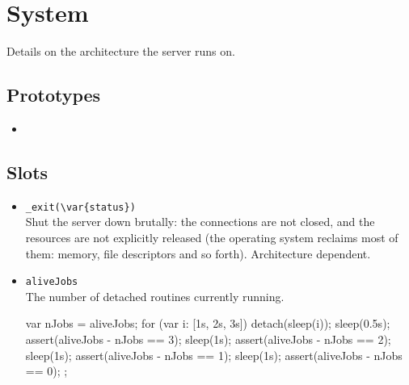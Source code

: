 \section{System}
Details on the architecture the \urbi server runs on.

\subsection{Prototypes}
\begin{itemize}
\item {}
\end{itemize}

\subsection{Slots}
\begin{itemize}

\item \lstinline|_exit(\var{status})|\\
  Shut the server down brutally: the connections are not closed, and
  the resources are not explicitly released (the operating system
  reclaims most of them: memory, file descriptors and so forth).
  Architecture dependent.

\item \lstinline|aliveJobs|\\
  The number of detached routines currently running.
\begin{urbiscript}
{
  var nJobs = aliveJobs;
  for (var i: [1s, 2s, 3s])
    detach({sleep(i)});
  sleep(0.5s);
  assert(aliveJobs - nJobs == 3);
  sleep(1s);
  assert(aliveJobs - nJobs == 2);
  sleep(1s);
  assert(aliveJobs - nJobs == 1);
  sleep(1s);
  assert(aliveJobs - nJobs == 0);
};
\end{urbiscript}


\end{itemize}
